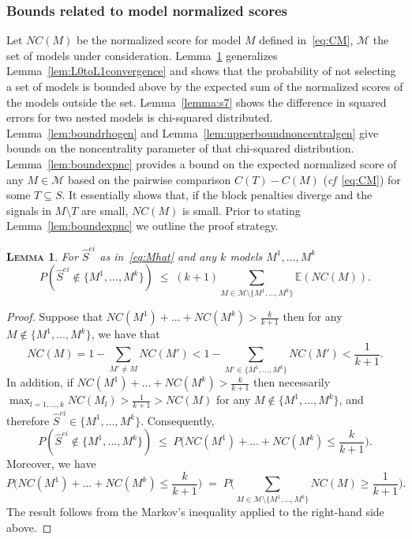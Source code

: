\documentclass[
  12pt]{article}
\newcommand{\E}{\mathbb{E}}
\newcommand{\M}{\mathcal{M}}
\newtheorem{lem}[thm]{\textsc{Lemma}}
\begin{document}
\subsubsection{Bounds related to model normalized scores}

Let $NC(M)$ be the normalized score for model $M$ defined in~\eqref{eq:CM}, $\M$ the set of models under consideration. Lemma~\ref{lem:L0toL1convergencegen} generalizes Lemma~\ref{lem:L0toL1convergence} and shows that the probability of not selecting a set of models is bounded above by the expected sum of the normalized scores of the models outside the set.  Lemma~\ref{lemma:s7} shows the difference in squared errors for two nested models is chi-squared distributed. Lemma~\ref{lem:boundrhogen} and Lemma~\ref{lem:upperboundnoncentralgen} give bounds on the noncentrality parameter of that chi-squared distribution. Lemma~\ref{lem:boundexpnc} provides a bound on the expected normalized score of any $M \in \M$ based on the pairwise comparison $C(T)-C(M)$ (\emph{cf}~\eqref{eq:CM}) for some $T\subseteq S$. It essentially shows that, if the block penalties diverge and the signals in $M\setminus T$ are small, $NC(M)$ is small. Prior to stating Lemma~\ref{lem:boundexpnc} we outline the proof strategy.

\begin{lem}\label{lem:L0toL1convergencegen} For $\hat{S}^{ei}$ as in~\eqref{eq:Mhat} and any $k$ models $M^1,\ldots,M^k$
$$P(\hat{S}^{ei}\not\in \{M^1,\ldots,M^k\})\;\leq\; (k+1) \sum_{M \in \M\setminus \{M^1,\ldots,M^k\}}\E\left( NC(M)\right).$$
\end{lem}

\begin{proof}
Suppose that $NC(M^1)+\ldots+NC(M^k)>\frac{k}{k+1}$ then for any $M\not\in \{M^1,\ldots,M^k\}$, we have that
$$NC(M)= 1-\sum_{M' \neq M} NC(M') < 1 - \sum_{M' \in \{M^1,\ldots,M^k\}} NC(M') < \frac{1}{k+1}.$$ 
In addition, if $NC(M^1)+\ldots+NC(M^k)>\frac{k}{k+1}$ then necessarily $\max_{l=1,\ldots,k}NC(M_l)> \frac{1}{k+1} > NC(M) $ for any $M \not\in \{M^1,\ldots,M^k\}$, and therefore $\hat{S}^{ei}\in \{M^1,\ldots,M^k\}$. Consequently, 
$$
P(\hat{S}^{ei}\not\in \{M^1,\ldots,M^k\})\; \leq\; P\Big(NC(M^1)+\ldots+NC(M^k)\leq\frac{k}{k+1}\Big).$$
Moreover, we have
$$P\Big(NC(M^1)+\ldots+NC(M^k)\leq\frac{k}{k+1}\Big)\;=\;P\Big(\sum_{M \in \M\setminus \{M^1,\ldots,M^k\}} NC(M)\geq \frac{1}{k+1}\Big).$$
The result follows from the Markov's inequality applied to the right-hand side above.
\end{proof}
\end{document}
